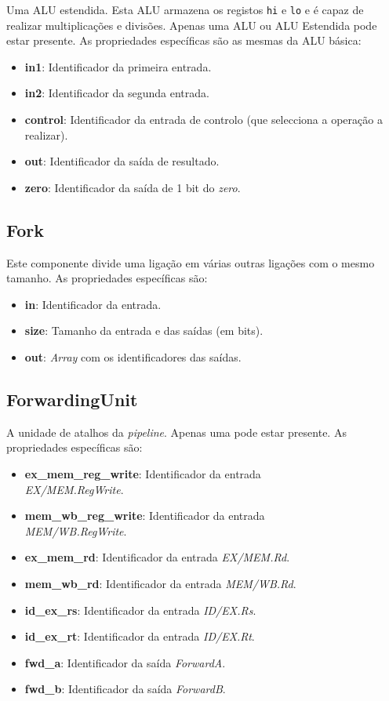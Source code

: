 \documentclass[11pt,a4paper,twoside,titlepage]{report}
\begin{document}
Uma ALU estendida. Esta ALU armazena os registos \verb+hi+ e \verb+lo+ e é capaz
de realizar multiplicações e divisões.
Apenas uma ALU ou ALU Estendida pode estar presente. As propriedades específicas
são as mesmas da ALU básica:
\begin{itemize}
	\item \textbf{in1}: Identificador da primeira entrada.
	\item \textbf{in2}: Identificador da segunda entrada.
	\item \textbf{control}: Identificador da entrada de controlo (que selecciona
		a operação a realizar).
	\item \textbf{out}: Identificador da saída de resultado.
	\item \textbf{zero}: Identificador da saída de 1 bit do \emph{zero}.
\end{itemize}

\subsection{Fork}

Este componente divide uma ligação em várias outras ligações com o mesmo tamanho.
As propriedades específicas são:
\begin{itemize}
	\item \textbf{in}: Identificador da entrada.
	\item \textbf{size}: Tamanho da entrada e das saídas (em bits).
	\item \textbf{out}: \emph{Array} com os identificadores das saídas.
\end{itemize}

\subsection{ForwardingUnit}

A unidade de atalhos da \emph{pipeline}. Apenas uma pode estar presente.
As propriedades específicas são:
\begin{itemize}
	\item \textbf{ex\_mem\_reg\_write}: Identificador da entrada\\ \emph{EX/MEM.RegWrite}.
	\item \textbf{mem\_wb\_reg\_write}: Identificador da entrada\\ \emph{MEM/WB.RegWrite}.
	\item \textbf{ex\_mem\_rd}: Identificador da entrada \emph{EX/MEM.Rd}.
	\item \textbf{mem\_wb\_rd}: Identificador da entrada \emph{MEM/WB.Rd}.
	\item \textbf{id\_ex\_rs}: Identificador da entrada \emph{ID/EX.Rs}.
	\item \textbf{id\_ex\_rt}: Identificador da entrada \emph{ID/EX.Rt}.
	\item \textbf{fwd\_a}: Identificador da saída \emph{ForwardA}.
	\item \textbf{fwd\_b}: Identificador da saída \emph{ForwardB}.
\end{itemize}
\end{document}
